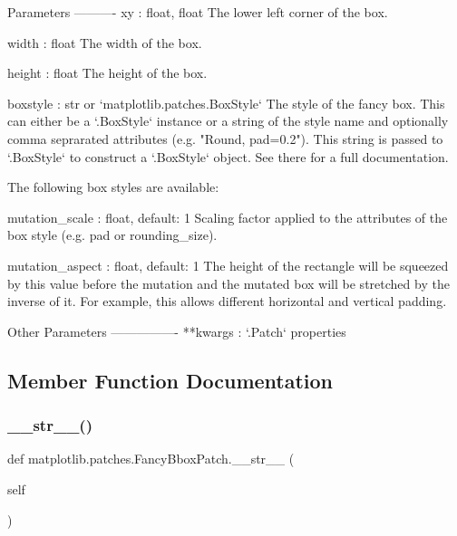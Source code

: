 \begin{DoxyVerb}Parameters
----------
xy : float, float
  The lower left corner of the box.

width : float
    The width of the box.

height : float
    The height of the box.

boxstyle : str or `matplotlib.patches.BoxStyle`
    The style of the fancy box. This can either be a `.BoxStyle`
    instance or a string of the style name and optionally comma
    seprarated attributes (e.g. "Round, pad=0.2"). This string is
    passed to `.BoxStyle` to construct a `.BoxStyle` object. See
    there for a full documentation.

    The following box styles are available:


mutation_scale : float, default: 1
    Scaling factor applied to the attributes of the box style
    (e.g. pad or rounding_size).

mutation_aspect : float, default: 1
    The height of the rectangle will be squeezed by this value before
    the mutation and the mutated box will be stretched by the inverse
    of it. For example, this allows different horizontal and vertical
    padding.

Other Parameters
----------------
**kwargs : `.Patch` properties

\end{DoxyVerb}
 

\subsection{Member Function Documentation}
\mbox{\label{classmatplotlib_1_1patches_1_1FancyBboxPatch_a0908095ba902f18353306e4a4c3e3594}} 
\subsubsection{\texorpdfstring{\+\_\+\+\_\+str\+\_\+\+\_\+()}{\_\_str\_\_()}}
{\footnotesize\ttfamily def matplotlib.\+patches.\+Fancy\+Bbox\+Patch.\+\_\+\+\_\+str\+\_\+\+\_\+ (\begin{DoxyParamCaption}\item[{}]{self }\end{DoxyParamCaption})}

